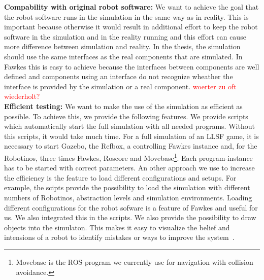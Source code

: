\textbf{Compability with original robot software:} We want to achieve the goal that the robot software runs in the simulation in the same way as in reality. This is important because otherwise it would result in additional effort to keep the robot software in the simulation and in the reality running and this effort can cause more difference between simulation and reality. In the thesis, the simulation should use the same interfaces as the real components that are simulated. In Fawkes this is easy to achieve because the interfaces between components are well defined and components using an interface do not recognize wheather the interface is provided by the simulation or a real component. \textcolor{red}{woerter zu oft wiederholt?}\\
\textbf{Efficient testing:} We want to make the use of the simulation as efficient as possible. To achieve this, we provide the following features. We provide scripts which automatically start the full simulation with all needed programs. Without this scripts, it would take much time. For a full simulation of an LLSF game, it is necessary to start Gazebo, the Refbox, a controlling Fawkes instance and, for the Robotinos, three times Fawkes, Roscore and Movebase\footnote{Movebase is the ROS program we currently use for navigation with collision avoidance.}. Each program-instance has to be started with correct parameters.  An other approach we use to increase the efficiency is the feature to load different configurations and setups. For example, the scipts provide the possibility to load the simulation with different numbers of Robotinos, abstraction levels and simulation environments. Loading different configurations for the robot sofware is a feature of Fawkes and useful for us. We also integrated this in the scripts. We also provide the possibility to draw objects into the simulaton. This makes it easy to visualize the belief and intensions of a robot to identify mistakes or ways to improve the system~\cite{Visualization}.\\
